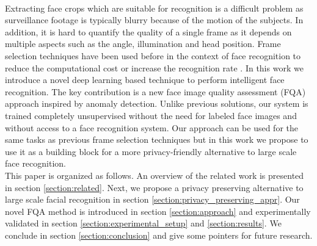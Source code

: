 \documentclass[letterpaper]{article} %
\begin{document}
\\
\newline
Extracting face crops which are suitable for recognition is a difficult problem as surveillance footage is typically blurry because of the motion of the subjects. In addition, it is hard to quantify the quality of a single frame as it depends on multiple aspects such as the angle, illumination and head position. Frame selection techniques have been used before in the context of face recognition  to reduce the computational cost or increase the recognition rate \cite{wong_cvprw_2011, anantharajah2012quality, qi2018boosting, vignesh2015face, best2017automatic, hernandez2020biometric, terhorst2020ser}. In this work we introduce a novel deep learning based technique to perform intelligent face recognition. The key contribution is a new face image quality assessment (FQA) approach inspired by anomaly detection. Unlike previous solutions, our system is trained completely unsupervised without the need for labeled face images and without access to a face recognition system. Our approach can be used for the same tasks as previous frame selection techniques but in this work we propose to use it as a building block for a more privacy-friendly alternative to large scale face recognition.
\\
\newline
This paper is organized as follows. An overview of the related work is presented in section \ref{section:related}. Next, we propose a privacy preserving alternative to large scale facial recognition in section \ref{section:privacy_preserving_appr}. Our novel FQA method is introduced in section \ref{section:approach} and experimentally validated in  section \ref{section:experimental_setup} and \ref{section:results}. We conclude in section \ref{section:conclusion} and give some pointers for future research.
\end{document}
